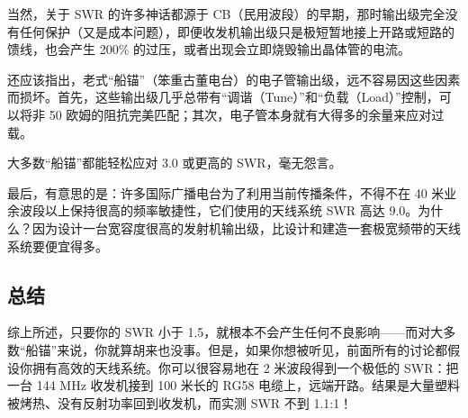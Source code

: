 \documentclass[11pt]{article}
\begin{document}
当然，关于 SWR 的许多神话都源于 CB（民用波段）的早期，那时输出级完全没有任何保护（又是成本问题），即便收发机输出级只是极短暂地接上开路或短路的馈线，也会产生 200\% 的过压，或者出现会立即烧毁输出晶体管的电流。

还应该指出，老式“船锚”（笨重古董电台）的电子管输出级，远不容易因这些因素而损坏。首先，这些输出级几乎总带有“调谐（Tune）”和“负载（Load）”控制，可以将非 50 欧姆的阻抗完美匹配；其次，电子管本身就有大得多的余量来应对过载。

大多数“船锚”都能轻松应对 3.0 或更高的 SWR，毫无怨言。

最后，有意思的是：许多国际广播电台为了利用当前传播条件，不得不在 40 米业余波段以上保持很高的频率敏捷性，它们使用的天线系统 SWR 高达 9.0。为什么？因为设计一台宽容度很高的发射机输出级，比设计和建造一套极宽频带的天线系统要便宜得多。

\subsection*{总结}

综上所述，只要你的 SWR 小于 1.5，就根本不会产生任何不良影响——而对大多数“船锚”来说，你就算胡来也没事。但是，如果你想被听见，前面所有的讨论都假设你拥有高效的天线系统。你可以很容易地在 2 米波段得到一个极低的 SWR：把一台 144 MHz 收发机接到 100 米长的 RG58 电缆上，远端开路。结果是大量塑料被烤热、没有反射功率回到收发机，而实测 SWR 不到 1.1:1！
\end{document}
